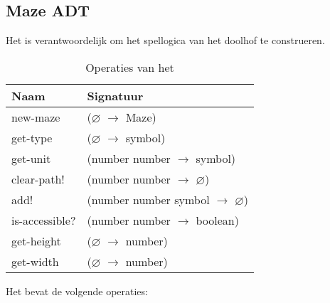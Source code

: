 
\subsection{Maze ADT}
\label{section:maze}
Het \texttt{} is verantwoordelijk om het spellogica van het doolhof te construeren.

\begin{table}[hbt]
\centering
\begin{tabular}{|ll|}
\hline
\rowcolor[HTML]{000000} 
{\color[HTML]{FFFFFF} \textbf{Naam}} & {\color[HTML]{FFFFFF} \textbf{Signatuur}} \\ \hline
new-maze   & ($\varnothing$ $\rightarrow$ Maze)                          \\ \hline
get-type   & ($\varnothing$ $\rightarrow$ symbol)                        \\ \hline
get-unit   & (number number $\rightarrow$ symbol)                        \\ \hline
clear-path! & (number number $\rightarrow$ $\varnothing$)                        \\ \hline
add!  & (number number symbol $\rightarrow$ $\varnothing$)                        \\ \hline
is-accessible?   & (number number $\rightarrow$ boolean)                       \\ \hline
get-height   & ($\varnothing$ $\rightarrow$ number)                        \\ \hline
get-width   & ($\varnothing$ $\rightarrow$ number)                        \\ \hline
\end{tabular}
\caption{Operaties van het \texttt{}}
\label{table:maze}
\end{table}

Het \texttt{} bevat de volgende operaties:


